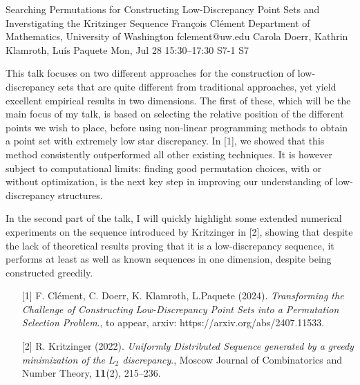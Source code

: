 \begin{talk}
  {Searching Permutations for Constructing Low-Discrepancy Point Sets and Inverstigating the Kritzinger Sequence}%
  {Fran\c{c}ois Cl\'{e}ment}%
  {Department of Mathematics, University of Washington}%
  {fclement@uw.edu}%
  {Carola Doerr, Kathrin Klamroth, Luís Paquete}%
  {}%
  {Mon, Jul 28 15:30–17:30}%
  {S7-1}%
  {S7}%
  
				
			
This talk focuses on two different approaches for the construction of low-discrepancy sets that are quite different from traditional approaches, yet yield excellent empirical results in two dimensions. The first of these, which will be the main focus of my talk, is based on selecting the relative position of the different points we wish to place, before using non-linear programming methods to obtain a point set with extremely low star discrepancy. In [1], we showed that this method consistently outperformed all other existing techniques. It is however subject to computational limits: finding good permutation choices, with or without optimization, is the next key step in improving our understanding of low-discrepancy structures.

In the second part of the talk, I will quickly highlight some extended numerical experiments on the sequence introduced by Kritzinger in [2], showing that despite the lack of theoretical results proving that it is a low-discrepancy sequence, it performs at least as well as known sequences in one dimension, despite being constructed greedily. 

\medskip

\begin{enumerate}
	\item[{[1]}] F. Clément, C. Doerr, K. Klamroth, L.Paquete (2024). {\it Transforming the Challenge of Constructing Low-Discrepancy Point Sets into a Permutation Selection Problem}., to appear, arxiv: https://arxiv.org/abs/2407.11533.
	\item[{[2]}] R. Kritzinger (2022).  {\it Uniformly Distributed Sequence generated by a greedy minimization of the $L_2$ discrepancy}., Moscow Journal of Combinatorics and Number Theory, \textbf{11}(2), 215--236.
\end{enumerate}

\end{talk}

